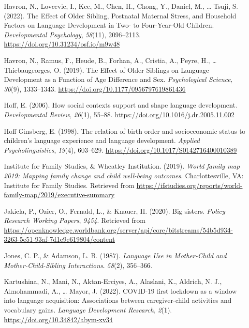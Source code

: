\documentclass[
  man,floatsintext]{apa6}
\newlength{\cslhangindent}
\newlength{\cslentryspacingunit} %
\newenvironment{CSLReferences}[2] %
 {%
  \setlength{\parindent}{0pt}
  \ifodd #1
  \let\oldpar\par
  \def\par{\hangindent=\cslhangindent\oldpar}
  \fi
  \setlength{\parskip}{#2\cslentryspacingunit}
 }%
 {}
\begin{document}
\begin{CSLReferences}{1}{0}
\leavevmode{}%
Havron, N., Lovcevic, I., Kee, M., Chen, H., Chong, Y., Daniel, M., \ldots{} Tsuji, S. (2022). The {Effect} of {Older} {Sibling}, {Postnatal} {Maternal} {Stress}, and {Household} {Factors} on {Language} {Development} in {Two}- to {Four}-{Year}-{Old} {Children}. \emph{Developmental Psychology}, \emph{58}(11), 2096--2113. \url{https://doi.org/10.31234/osf.io/m9w48}

\leavevmode{}%
Havron, N., Ramus, F., Heude, B., Forhan, A., Cristia, A., Peyre, H., \ldots{} Thiebaugeorges, O. (2019). The {Effect} of {Older} {Siblings} on {Language} {Development} as a {Function} of {Age} {Difference} and {Sex}. \emph{Psychological Science}, \emph{30}(9), 1333--1343. \url{https://doi.org/10.1177/0956797619861436}

\leavevmode{}%
Hoff, E. (2006). How social contexts support and shape language development. \emph{Developmental Review}, \emph{26}(1), 55--88. \url{https://doi.org/10.1016/j.dr.2005.11.002}

\leavevmode{}%
Hoff-Ginsberg, E. (1998). The relation of birth order and socioeconomic status to children's language experience and language development. \emph{Applied Psycholinguistics}, \emph{19}(4), 603--629. \url{https://doi.org/10.1017/S0142716400010389}

\leavevmode{}%
Institute for Family Studies, \& Wheatley Institution. (2019). \emph{World family map 2019: {Mapping} family change and child well-being outcomes}. Charlottesville, VA: Institute for Family Studies. Retrieved from \url{https://ifstudies.org/reports/world-family-map/2019/executive-summary}

\leavevmode{}%
Jakiela, P., Ozier, O., Fernald, L., \& Knauer, H. (2020). Big sisters. \emph{Policy Research Working Papers}, \emph{9454}. Retrieved from \url{https://openknowledge.worldbank.org/server/api/core/bitstreams/54b5d934-3263-5e51-93af-7d1e9e619804/content}

\leavevmode{}%
Jones, C. P., \& Adamson, L. B. (1987). \emph{Language {Use} in {Mother}-{Child} and {Mother}-{Child}-{Sibling} {Interactions}}. \emph{58}(2), 356--366.

\leavevmode{}%
Kartushina, N., Mani, N., Aktan-Erciyes, A., Alaslani, K., Aldrich, N. J., Almohammadi, A., \ldots{} Mayor, J. (2022). {COVID}-19 first lockdown as a window into language acquisition: Associations between caregiver-child activities and vocabulary gains. \emph{Language Development Research}, \emph{2}(1). \url{https://doi.org/10.34842/abym-xv34}


\end{CSLReferences}
\end{document}
